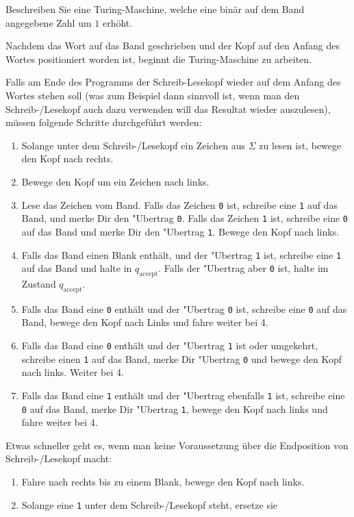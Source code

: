 Beschreiben Sie eine Turing-Maschine, welche eine binär auf dem
Band angegebene Zahl um $1$ erhöht.


\begin{loesung}
Nachdem das Wort auf das Band geschrieben und der Kopf auf den
Anfang des Wortes positioniert worden ist, beginnt die Turing-Maschine
zu arbeiten. 

Falls am Ende des Programms der Schreib-Lesekopf wieder auf dem
Anfang des Wortes stehen soll (was zum Beispiel dann sinnvoll ist,
wenn man den Schreib-/Lesekopf auch dazu verwenden will das
Resultat wieder auszulesen),  müssen folgende
Schritte durchgeführt werden:
\begin{enumerate}
\item Solange unter dem Schreib-/Lesekopf ein Zeichen aus $\Sigma$
zu lesen ist, bewege den Kopf nach rechts.
\item Bewege den Kopf um ein Zeichen nach links.
\item Lese das Zeichen vom Band. Falls das Zeichen {\tt 0} ist,
schreibe eine {\tt 1} auf das Band, und merke Dir den "Ubertrag {\tt 0}.
Falls das Zeichen {\tt 1} ist, schreibe eine {\tt 0} auf das Band und
merke Dir den "Ubertrag {\tt 1}.
Bewege den Kopf nach links.
\item Falls das Band einen Blank enthält, und der "Ubertrag {\tt 1}
ist, schreibe eine {\tt 1} auf das Band und halte in $q_{\text{accept}}$.
Falls der "Ubertrag aber {\tt 0} ist, halte im Zustand $q_{\text{accept}}$.
\item Falls das Band eine {\tt 0} enthält und der "Ubertrag {\tt 0} ist,
schreibe eine {\tt 0} auf das Band, bewege den Kopf nach Links und fahre
weiter bei 4.
\item Falls das Band eine {\tt 0} enthält und der "Ubertrag {\tt 1}
ist oder umgekehrt, schreibe einen {\tt 1} auf das Band, merke Dir
"Ubertrag {\tt 0} und bewege den Kopf nach links. Weiter bei 4.
\item Falls das Band eine {\tt 1} enthält und der "Ubertrag ebenfalls
{\tt 1} ist, schreibe eine {\tt 0} auf das Band, merke Dir "Ubertrag {\tt 1},
bewege den Kopf nach links und fahre weiter bei 4.
\end{enumerate}
Etwas schneller geht es, wenn man keine Voraussetzung über die
Endposition von Schreib-/Lesekopf macht:
\begin{enumerate}
\item Fahre nach rechts bis zu einem Blank, bewege den Kopf nach links.
\item Solange eine {\tt 1} unter dem Schreib-/Lesekopf steht, ersetze sie

\end{enumerate}
\end{loesung}
